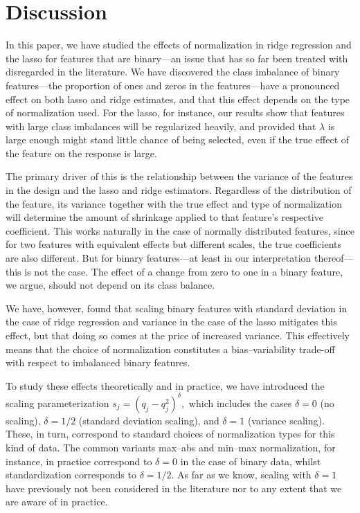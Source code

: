 \section{Discussion}\label{sec:discussion}

In this paper, we have studied the effects of normalization in ridge regression and the
lasso for features that are binary---an issue that has so far been treated with disregarded
in the literature. We have discovered the class imbalance of binary features---the
proportion of ones and zeros in the features---have a pronounced effect on both lasso and
ridge estimates, and that this effect depends on the type of normalization used. For the
lasso, for instance, our results show that features with large class imbalances will be
regularized heavily, and provided that \(\lambda\) is large enough might stand little
chance of being selected, even if the true effect of the feature on the response is large.

The primary driver of this is the relationship between the variance of the features in the
design and the lasso and ridge estimators. Regardless of the distribution of the feature,
its variance together with the true effect and type of normalization will determine the
amount of shrinkage applied to that feature's respective coefficient. This works naturally
in the case of normally distributed features, since for two features with equivalent
effects but different scales, the true coefficients are also different. But for binary
features---at least in our interpretation thereof---this is not the case. The effect of a
change from zero to one in a binary feature, we argue, should not depend on its class
balance.

We have, however, found that scaling binary features with standard deviation in the case of
ridge regression and variance in the case of the lasso mitigates this effect, but that
doing so comes at the price of increased variance. This effectively means that the choice
of normalization constitutes a bias--variability trade-off with respect to imbalanced
binary features.

To study these effects theoretically and in practice, we have introduced the scaling
parameterization $s_j = (q_j - q_j^2)^\delta,$ which includes the cases \(\delta=0\) (no
scaling), \(\delta = 1/2\) (standard deviation scaling), and \(\delta=1\) (variance
scaling). These, in turn, correspond to standard choices of normalization types for this
kind of data. The common variants max--abs and min--max normalization, for instance, in
practice correspond to \(\delta = 0\) in the case of binary data, whilst standardization
corresponds to \(\delta = 1/2\). As far as we know, scaling with \(\delta=1\) have
previously not been considered in the literature nor to any extent that we are aware of in
practice.

